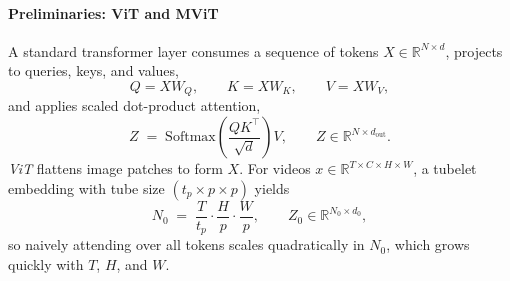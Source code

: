 \begin{enrichment}
\begin{enrichment}
        \paragraph{Preliminaries: ViT and MViT}
        A standard transformer layer consumes a sequence of tokens $X\!\in\!\mathbb{R}^{N\times d}$, projects to queries, keys, and values,
        \begin{equation}
            Q = XW_Q,\qquad K = XW_K,\qquad V = XW_V,
            \label{eq:memvit_linear}
        \end{equation}
        and applies scaled dot-product attention,
        \begin{equation}
            Z \;=\; \mathrm{Softmax}\!\left(\frac{QK^{\top}}{\sqrt{d}}\right)V,\qquad Z\in\mathbb{R}^{N\times d_{\text{out}}}.
            \label{eq:memvit_attn}
        \end{equation}
        \emph{ViT} flattens image patches to form $X$. For videos $x\!\in\!\mathbb{R}^{T\times C\times H\times W}$, a tubelet embedding with tube size $(t_p\!\times\!p\!\times\!p)$ yields
        \[
        N_0 \;=\; \frac{T}{t_p}\cdot\frac{H}{p}\cdot\frac{W}{p},\qquad Z_0\in\mathbb{R}^{N_0\times d_0},
        \]
        so naively attending over all tokens scales quadratically in $N_0$, which grows quickly with $T$, $H$, and $W$.
        

\end{enrichment}
\end{enrichment}

